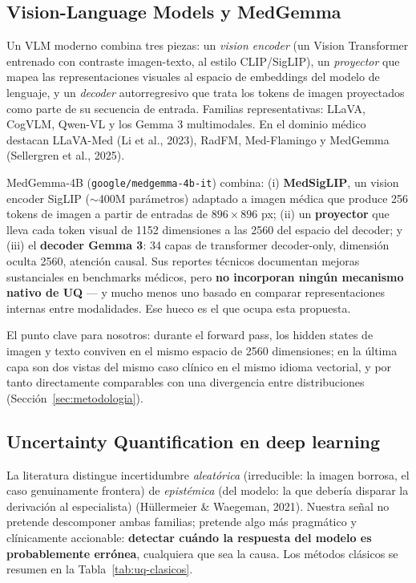 \documentclass[12pt,a4paper]{article}
\begin{document}
\subsection{Vision-Language Models y MedGemma}

Un VLM moderno combina tres piezas: un \emph{vision encoder} (un Vision
Transformer entrenado con contraste imagen-texto, al estilo CLIP/SigLIP),
un \emph{proyector} que mapea las representaciones visuales al espacio de
embeddings del modelo de lenguaje, y un \emph{decoder} autorregresivo que
trata los tokens de imagen proyectados como parte de su secuencia de
entrada. Familias representativas: LLaVA, CogVLM, Qwen-VL y los Gemma 3
multimodales. En el dominio médico destacan LLaVA-Med (Li et al., 2023),
RadFM, Med-Flamingo y MedGemma (Sellergren et al., 2025).

MedGemma-4B (\texttt{google/medgemma-4b-it}) combina: (i)
\textbf{MedSigLIP}, un vision encoder SigLIP ($\sim$400M parámetros)
adaptado a imagen médica que produce 256 tokens de imagen a partir de
entradas de $896\times896$ px; (ii) un \textbf{proyector} que lleva cada
token visual de 1152 dimensiones a las 2560 del espacio del decoder; y
(iii) el \textbf{decoder Gemma 3}: 34 capas de transformer decoder-only,
dimensión oculta 2560, atención causal. Sus reportes técnicos documentan
mejoras sustanciales en benchmarks médicos, pero \textbf{no incorporan
ningún mecanismo nativo de UQ} --- y mucho menos uno basado en comparar
representaciones internas entre modalidades. Ese hueco es el que ocupa
esta propuesta.

El punto clave para nosotros: durante el forward pass, los hidden states
de imagen y texto conviven en el mismo espacio de 2560 dimensiones; en la
última capa son dos vistas del mismo caso clínico en el mismo idioma
vectorial, y por tanto directamente comparables con una divergencia entre
distribuciones (Sección~\ref{sec:metodologia}).

\subsection{Uncertainty Quantification en deep learning}

La literatura distingue incertidumbre \emph{aleatórica} (irreducible: la
imagen borrosa, el caso genuinamente frontera) de \emph{epistémica} (del
modelo: la que debería disparar la derivación al especialista)
(Hüllermeier \& Waegeman, 2021). Nuestra señal no pretende descomponer
ambas familias; pretende algo más pragmático y clínicamente accionable:
\textbf{detectar cuándo la respuesta del modelo es probablemente errónea},
cualquiera que sea la causa. Los métodos clásicos se resumen en la
Tabla~\ref{tab:uq-clasicos}.
\end{document}
